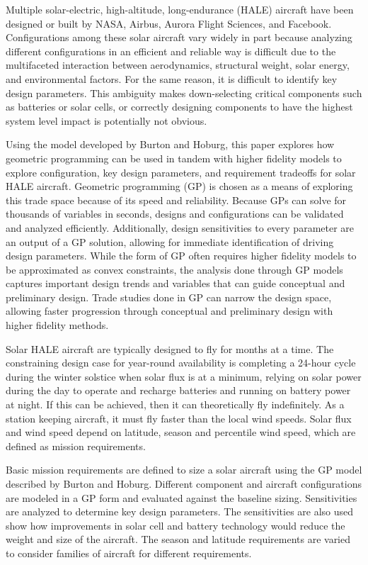 \documentclass[]{aiaa-tc}%
\begin{document}
Multiple solar-electric, high-altitude, long-endurance (HALE) aircraft have been designed or built by NASA\cite{dunbar_2015}, Airbus\cite{zephyr}, Aurora Flight Sciences\cite{odysseus}, and Facebook\cite{aquila}.
Configurations among these solar aircraft vary widely in part because analyzing different configurations in an efficient and reliable way is difficult due to the multifaceted interaction between aerodynamics, structural weight, solar energy, and environmental factors.\cite{solartech}
For the same reason, it is difficult to identify key design parameters.  
This ambiguity makes down-selecting critical components such as batteries or solar cells, or correctly designing components to have the highest system level impact is potentially not obvious.  

Using the model developed by Burton and Hoburg\cite{burton_solar_2017}, this paper explores how geometric programming can be used in tandem with higher fidelity models to explore configuration, key design parameters, and requirement tradeoffs for solar HALE aircraft.
Geometric programming (GP) is chosen as a means of exploring this trade space because of its speed and reliability.  
Because GPs can solve for thousands of variables in seconds\cite{gp}, designs and configurations can be validated and analyzed efficiently.  
Additionally, design sensitivities to every parameter are an output of a GP solution, allowing for immediate identification of driving design parameters. 
While the form of GP often requires higher fidelity models to be approximated as convex constraints\cite{gpkit}, the analysis done through GP models captures important design trends and variables that can guide conceptual and preliminary design. 
Trade studies done in GP can narrow the design space, allowing faster progression through conceptual and preliminary design with higher fidelity methods. 
 
Solar HALE aircraft are typically designed to fly for months at a time.\cite{aquila}  
The constraining design case for year-round availability is completing a 24-hour cycle during the winter solstice when solar flux is at a minimum, relying on solar power during the day to operate and recharge batteries and running on battery power at night. 
If this can be achieved, then it can theoretically fly indefinitely.  
As a station keeping aircraft, it must fly faster than the local wind speeds. 
Solar flux and wind speed depend on latitude, season and percentile wind speed, which are defined as mission requirements.

Basic mission requirements are defined to size a solar aircraft using the GP model described by Burton and Hoburg.\cite{burton_solar_2017}
Different component and aircraft configurations are modeled in a GP form and evaluated against the baseline sizing. 
Sensitivities are analyzed to determine key design parameters. 
The sensitivities are also used show how improvements in solar cell and battery technology would reduce the weight and size of the aircraft. 
The season and latitude requirements are varied to consider families of aircraft for different requirements.  
\end{document}
